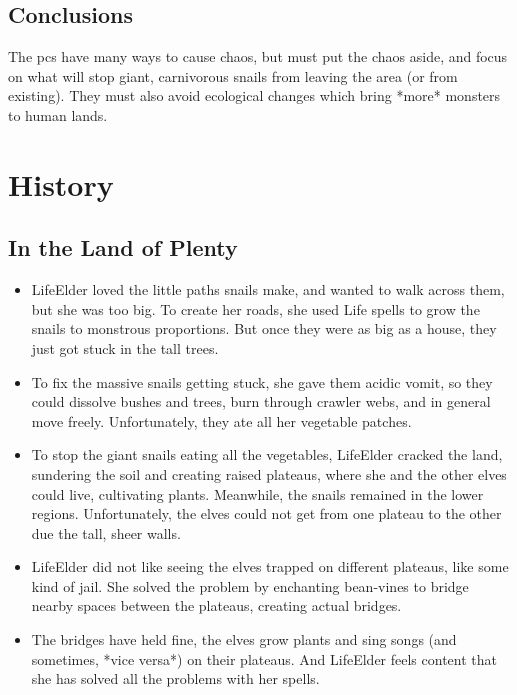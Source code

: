 \subsection{Conclusions}

The \glspl{pc} have many ways to cause chaos, but must put the chaos aside, and focus on what will stop giant, carnivorous snails from leaving the area (or from existing).
They must also avoid ecological changes which bring *more* monsters to human lands.

\section{History}

\subsection{In the Land of Plenty}


\begin{itemize}
  \item
  LifeElder loved the little paths snails make, and wanted to walk across them, but she was too big.
  To create her roads, she used Life spells to grow the snails to monstrous proportions.
  But once they were as big as a house, they just got stuck in the tall trees.
  \item
  To fix the massive snails getting stuck, she gave them acidic vomit, so they could dissolve bushes and trees, burn through \gls{crawler} webs, and in general move freely.
  Unfortunately, they ate all her vegetable patches.
  \item
  To stop the giant snails eating all the vegetables, LifeElder cracked the land, sundering the soil and creating raised plateaus, where she and the other elves could live, cultivating plants.
  Meanwhile, the snails remained in the lower regions.
  Unfortunately, the elves could not get from one plateau to the other due the tall, sheer walls.
  \item
  LifeElder did not like seeing the elves trapped on different plateaus, like some kind of jail.
  She solved the problem by enchanting bean-vines to bridge nearby spaces between the plateaus, creating actual bridges.
  \item
  The bridges have held fine, the elves grow plants and sing songs (and sometimes, *vice versa*) on their plateaus.
  And LifeElder feels content that she has solved all the problems with her spells.
\end{itemize}

